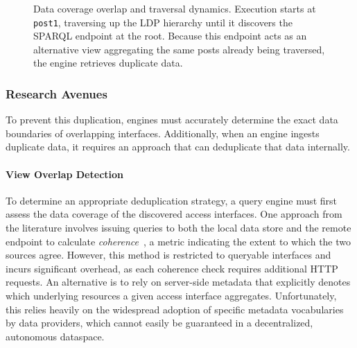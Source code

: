 \documentclass{ceurart}
\theoremstyle{definition}
\begin{document}
\begin{figure}[htbp]
    \caption{Data coverage overlap and traversal dynamics. Execution starts at \texttt{post1}, traversing up the LDP hierarchy until it discovers the SPARQL endpoint at the root. Because this endpoint acts as an alternative view aggregating the same posts already being traversed, the engine retrieves duplicate data.}
    \label{fig:view_overlap_final}
\end{figure}

\subsubsection{Research Avenues}

To prevent this duplication, engines must accurately determine the exact data boundaries of overlapping interfaces.
Additionally, when an engine ingests duplicate data, it requires
an approach that can deduplicate that data internally.

\paragraph{View Overlap Detection}
To determine an appropriate deduplication strategy,
a query engine must first assess the data coverage of the discovered access interfaces.
One approach from the literature involves issuing queries to both the local data store
and the remote endpoint to calculate \emph{coherence}~\cite{umbrich2012hybrid}, a metric indicating the extent to which the two sources agree.
However, this method is restricted to queryable interfaces and incurs significant overhead,
as each coherence check requires additional HTTP requests.
An alternative is to rely on server-side metadata that explicitly denotes which underlying resources a given access interface aggregates.
Unfortunately, this relies heavily on the widespread adoption of specific metadata vocabularies by data providers,
which cannot easily be guaranteed in a decentralized, autonomous dataspace.
\end{document}
